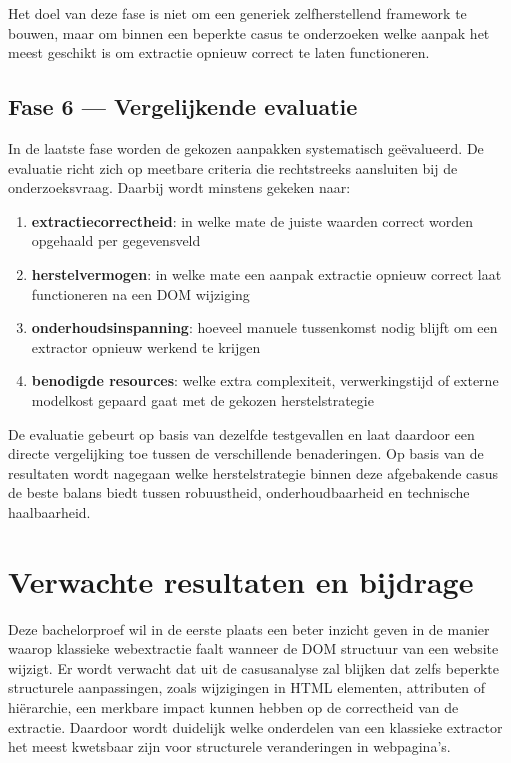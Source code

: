 Het doel van deze fase is niet om een generiek zelfherstellend framework te bouwen, maar om binnen een beperkte casus te onderzoeken welke aanpak het meest geschikt is om extractie opnieuw correct te laten functioneren.

\subsection{Fase 6 --- Vergelijkende evaluatie}
\label{subsec:meth-fase6}

In de laatste fase worden de gekozen aanpakken systematisch geëvalueerd. De evaluatie richt zich op meetbare criteria die rechtstreeks aansluiten bij de onderzoeksvraag. Daarbij wordt minstens gekeken naar:
\begin{enumerate}
    \item \textbf{extractiecorrectheid}: in welke mate de juiste waarden correct worden opgehaald per gegevensveld
    \item \textbf{herstelvermogen}: in welke mate een aanpak extractie opnieuw correct laat functioneren na een DOM wijziging
    \item \textbf{onderhoudsinspanning}: hoeveel manuele tussenkomst nodig blijft om een extractor opnieuw werkend te krijgen
    \item \textbf{benodigde resources}: welke extra complexiteit, verwerkingstijd of externe modelkost gepaard gaat met de gekozen herstelstrategie
\end{enumerate}

De evaluatie gebeurt op basis van dezelfde testgevallen en laat daardoor een directe vergelijking toe tussen de verschillende benaderingen. Op basis van de resultaten wordt nagegaan welke herstelstrategie binnen deze afgebakende casus de beste balans biedt tussen robuustheid, onderhoudbaarheid en technische haalbaarheid.


\sloppy
\section{Verwachte resultaten en bijdrage}
\label{sec:verwachte-resultaten}

Deze bachelorproef wil in de eerste plaats een beter inzicht geven in de manier waarop klassieke webextractie faalt wanneer de DOM structuur van een website wijzigt. Er wordt verwacht dat uit de casusanalyse zal blijken dat zelfs beperkte structurele aanpassingen, zoals wijzigingen in HTML elementen, attributen of hiërarchie, een merkbare impact kunnen hebben op de correctheid van de extractie. Daardoor wordt duidelijk welke onderdelen van een klassieke extractor het meest kwetsbaar zijn voor structurele veranderingen in webpagina's.


